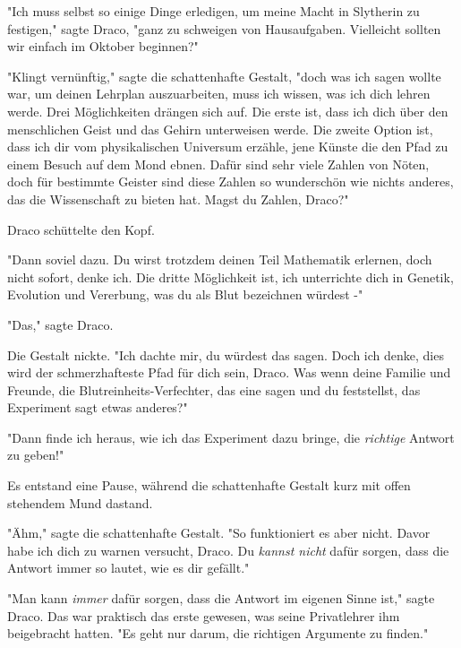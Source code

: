 {"Ich muss selbst so einige Dinge erledigen, um meine Macht in Slytherin zu festigen," sagte Draco, "ganz zu schweigen von Hausaufgaben. Vielleicht sollten wir einfach im Oktober beginnen?"

"Klingt vernünftig," sagte die schattenhafte Gestalt, "doch was ich sagen wollte war, um deinen Lehrplan auszuarbeiten, muss ich wissen, was ich dich lehren werde. Drei Möglichkeiten drängen sich auf. Die erste ist, dass ich dich über den menschlichen Geist und das Gehirn unterweisen werde. Die zweite Option ist, dass ich dir vom physikalischen Universum erzähle, jene Künste die den Pfad zu einem Besuch auf dem Mond ebnen. Dafür sind sehr viele Zahlen von Nöten, doch für bestimmte Geister sind diese Zahlen so wunderschön wie nichts anderes, das die Wissenschaft zu bieten hat. Magst du Zahlen, Draco?"

Draco schüttelte den Kopf.

"Dann soviel dazu. Du wirst trotzdem deinen Teil Mathematik erlernen, doch nicht sofort, denke ich. Die dritte Möglichkeit ist, ich unterrichte dich in Genetik, Evolution und Vererbung, was du als Blut bezeichnen würdest -"

"Das," sagte Draco.

Die Gestalt nickte. "Ich dachte mir, du würdest das sagen. Doch ich denke, dies wird der schmerzhafteste Pfad für dich sein, Draco. Was wenn deine Familie und Freunde, die Blutreinheits-Verfechter, das eine sagen und du feststellst, das Experiment sagt etwas anderes?"

"Dann finde ich heraus, wie ich das Experiment dazu bringe, die \emph{richtige} Antwort zu geben!"

Es entstand eine Pause, während die schattenhafte Gestalt kurz mit offen stehendem Mund dastand.

"Ähm," sagte die schattenhafte Gestalt. "So funktioniert es aber nicht. Davor habe ich dich zu warnen versucht, Draco. Du \emph{kannst nicht} dafür sorgen, dass die Antwort immer so lautet, wie es dir gefällt."

"Man kann \emph{immer} dafür sorgen, dass die Antwort im eigenen Sinne ist," sagte Draco. Das war praktisch das erste gewesen, was seine Privatlehrer ihm beigebracht hatten. "Es geht nur darum, die richtigen Argumente zu finden."

}
